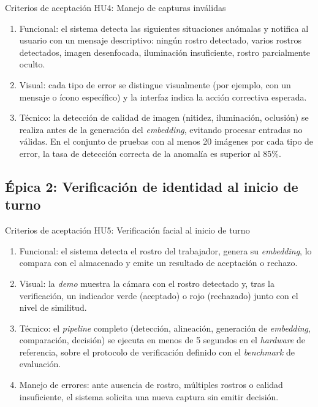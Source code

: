 \documentclass[
  11pt, %
]{charter}
\begin{document}
Criterios de aceptación HU4: Manejo de capturas inválidas
\begin{enumerate}
  \item Funcional: el sistema detecta las siguientes situaciones anómalas y notifica al usuario con un mensaje descriptivo: ningún rostro detectado, varios rostros detectados, imagen desenfocada, iluminación insuficiente, rostro parcialmente oculto.
  \item Visual: cada tipo de error se distingue visualmente (por ejemplo, con un mensaje o ícono específico) y la interfaz indica la acción correctiva esperada.
  \item Técnico: la detección de calidad de imagen (nitidez, iluminación, oclusión) se realiza antes de la generación del \textit{embedding}, evitando procesar entradas no válidas. En el conjunto de pruebas con al menos 20 imágenes por cada tipo de error, la tasa de detección correcta de la anomalía es superior al 85\%.
\end{enumerate}

\subsection{Épica 2: Verificación de identidad al inicio de turno}

Criterios de aceptación HU5: Verificación facial al inicio de turno
\begin{enumerate}
  \item Funcional: el sistema detecta el rostro del trabajador, genera su \textit{embedding}, lo compara con el almacenado y emite un resultado de aceptación o rechazo.
  \item Visual: la \textit{demo} muestra la cámara con el rostro detectado y, tras la verificación, un indicador verde (aceptado) o rojo (rechazado) junto con el nivel de similitud.
  \item Técnico: el \textit{pipeline} completo (detección, alineación, generación de \textit{embedding}, comparación, decisión) se ejecuta en menos de 5 segundos en el \textit{hardware} de referencia, sobre el protocolo de verificación definido con el \textit{benchmark} de evaluación.
  \item Manejo de errores: ante ausencia de rostro, múltiples rostros o calidad insuficiente, el sistema solicita una nueva captura sin emitir decisión.
\end{enumerate}
\end{document}
